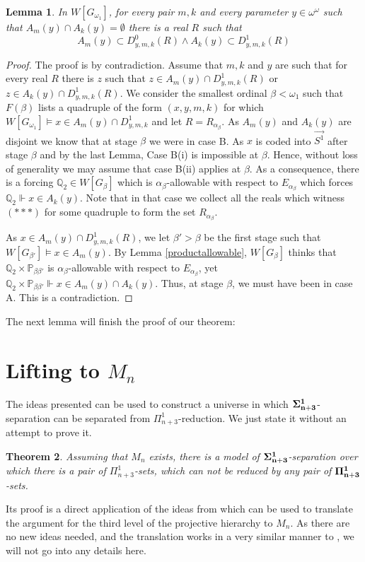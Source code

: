 \documentclass[a4paper,11pt]{article}
\newtheorem{theorem}{Theorem}[section]
\newtheorem{lemma}[theorem]{Lemma}
\newcommand{\forceP}{\mathbb{P}}
\newcommand{\forceQ}{\mathbb{Q}}
\begin{document}
\begin{lemma}
In $W[G_{\omega_1}]$, for every pair $m,k$ and every parameter $y \in \omega^{\omega}$ such that $A_m(y) \cap A_k(y) = \emptyset$ there is a real $R$ such that 
\[ A_m(y) \subset D^0_{y,m,k}(R) \land A_k(y) \subset D^1_{y,m,k}(R)\]
\end{lemma}
\begin{proof}
The proof is by contradiction. Assume that $m,k$ and $y$ are such that for every real $R$ there is $z$ such that $z \in A_m(y) \cap D^1_{y,m,k}(R)$ or $z \in A_k(y) \cap D^1_{y,m,k} (R)$.
We consider the smallest ordinal $\beta < \omega_1$ such that  $F(\beta)$ lists a quadruple of the form $(x,y,m,k)$ for which $W[G_{\omega_1}] \models x \in A_m(y) \cap D^1_{y,m,k}$ and let $R= R_{\alpha_{\beta}}$. As $A_m(y)$ and $A_k(y)$ are disjoint we know that at stage $\beta$ we were in case B. 
As $x$ is coded into $\vec{S^1}$ after stage $\beta$ and by the last Lemma, Case B(i) is impossible at $\beta$. Hence, without loss of generality we may assume that case B(ii) applies at $\beta$. As a consequence, there is a forcing $\forceQ_2 \in W[G_{\beta} ]$ which is $\alpha_{\beta}$-allowable with respect to $E_{\alpha_{\beta}}$ which forces $\forceQ_2 \Vdash x \in A_k(y)$. Note that in that case we collect all the reals which witness $( {\ast} {\ast} {\ast})$ for some quadruple to form the set $R_{\alpha_{\beta}}$. 

As $x \in A_m(y) \cap  D^1_{y,m,k} (R)$, we let $\beta'> \beta$ be the first stage such that $W[G_{\beta'}] \models x \in A_m(y)$. By Lemma \ref{productallowable}, $W[G_{\beta}]$ thinks that $\forceQ_2 \times \forceP_{\beta \beta'}$ is $\alpha_{\beta}$-allowable with respect to $E_{\alpha_{\beta}}$, yet 
$\forceQ_2 \times \forceP_{\beta \beta'} \Vdash x \in A_m(y) \cap A_k(y)$. Thus, at stage $\beta$, we must have been in case A. This is a contradiction.
\end{proof}

The next lemma will finish the proof of our theorem:





\section{Lifting to $M_n$}

The ideas presented can be used to construct a universe in which $\bf{\Sigma}^1_{n+3}$-separation can be separated from $\Pi^1_{n+3}$-reduction. We just state it without an attempt to prove it.
\begin{theorem}
Assuming that $M_n$ exists, there is a model of $\bf{\Sigma}^1_{n+3}$-separation over which there is a pair of $\Pi^1_{n+3}$-sets, which can not be reduced by any pair of $\bf{\Pi}^1_{n+3}$-sets.
\end{theorem}
Its proof is a direct application of the ideas from \cite{Ho2} which can be used to translate the argument for the third level of the projective hierarchy to $M_n$.
As there are no new ideas needed, and the translation works in a very similar manner to \cite{Ho2}, we will not go into any details here.
\end{document}
